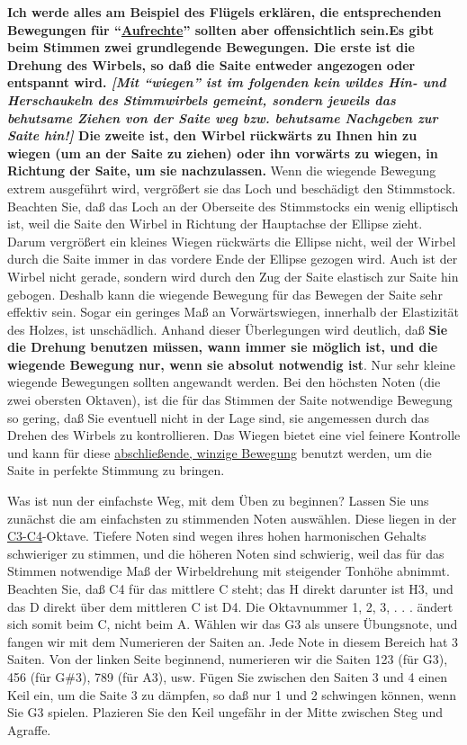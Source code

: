 {\normalsize \textbf{Ich werde alles am Beispiel des Flügels erklären, die entsprechenden Bewegungen für \enquote{\hyperlink{upright}{Aufrechte}} sollten aber offensichtlich sein.}}\textbf{Es gibt beim Stimmen zwei grundlegende Bewegungen.
 Die erste ist die Drehung des Wirbels, so daß die Saite entweder angezogen oder entspannt wird.
 \textit{[Mit \enquote{wiegen} ist im folgenden kein wildes Hin- und Herschaukeln des Stimmwirbels gemeint, sondern jeweils das behutsame Ziehen von der Saite weg bzw. behutsame Nachgeben zur Saite hin!]}
 Die zweite ist, den Wirbel rückwärts zu Ihnen hin zu wiegen (um an der Saite zu ziehen) oder ihn vorwärts zu wiegen, in Richtung der Saite, um sie nachzulassen.}
 Wenn die wiegende Bewegung extrem ausgeführt wird, vergrößert sie das Loch und beschädigt den Stimmstock.
 Beachten Sie, daß das Loch an der Oberseite des Stimmstocks ein wenig elliptisch ist, weil die Saite den Wirbel in Richtung der Hauptachse der Ellipse zieht.
 Darum vergrößert ein kleines Wiegen rückwärts die Ellipse nicht, weil der Wirbel durch die Saite immer in das vordere Ende der Ellipse gezogen wird.
 Auch ist der Wirbel nicht gerade, sondern wird durch den Zug der Saite elastisch zur Saite hin gebogen.
 Deshalb kann die wiegende Bewegung für das Bewegen der Saite sehr effektiv sein.
 Sogar ein geringes Maß an Vorwärtswiegen, innerhalb der Elastizität des Holzes, ist unschädlich.
 Anhand dieser Überlegungen wird deutlich, daß \textbf{Sie die Drehung benutzen müssen, wann immer sie möglich ist, und die wiegende Bewegung nur, wenn sie absolut notwendig ist}.
 Nur sehr kleine wiegende Bewegungen sollten angewandt werden.
 Bei den höchsten Noten (die zwei obersten Oktaven), ist die für das Stimmen der Saite notwendige Bewegung so gering, daß Sie eventuell nicht in der Lage sind, sie angemessen durch das Drehen des Wirbels zu kontrollieren.
 Das Wiegen bietet eine viel feinere Kontrolle und kann für diese \hyperlink{c2_5_infi}{abschließende, winzige Bewegung} benutzt werden, um die Saite in perfekte Stimmung zu bringen.
 

Was ist nun der einfachste Weg, mit dem Üben zu beginnen?
 Lassen Sie uns zunächst die am einfachsten zu stimmenden Noten auswählen.
 Diese liegen in der \hyperlink{Noten}{C3-C4}-Oktave.
 Tiefere Noten sind wegen ihres hohen harmonischen Gehalts schwieriger zu stimmen, und die höheren Noten sind schwierig, weil das für das Stimmen notwendige Maß der Wirbeldrehung mit steigender Tonhöhe abnimmt.
 Beachten Sie, daß C4 für das mittlere C steht; das H direkt darunter ist H3, und das D direkt über dem mittleren C ist D4.
 Die Oktavnummer 1, 2, 3, . . . ändert sich somit beim C, nicht beim A.
 Wählen wir das G3 als unsere Übungsnote, und fangen wir mit dem Numerieren der Saiten an.
 Jede Note in diesem Bereich hat 3 Saiten.
 Von der linken Seite beginnend, numerieren wir die Saiten 123 (für G3), 456 (für G\#3), 789 (für A3), usw.
 Fügen Sie zwischen den Saiten 3 und 4 einen Keil ein, um die Saite 3 zu dämpfen, so daß nur 1 und 2 schwingen können, wenn Sie G3 spielen.
 Plazieren Sie den Keil ungefähr in der Mitte zwischen Steg und Agraffe.
 

